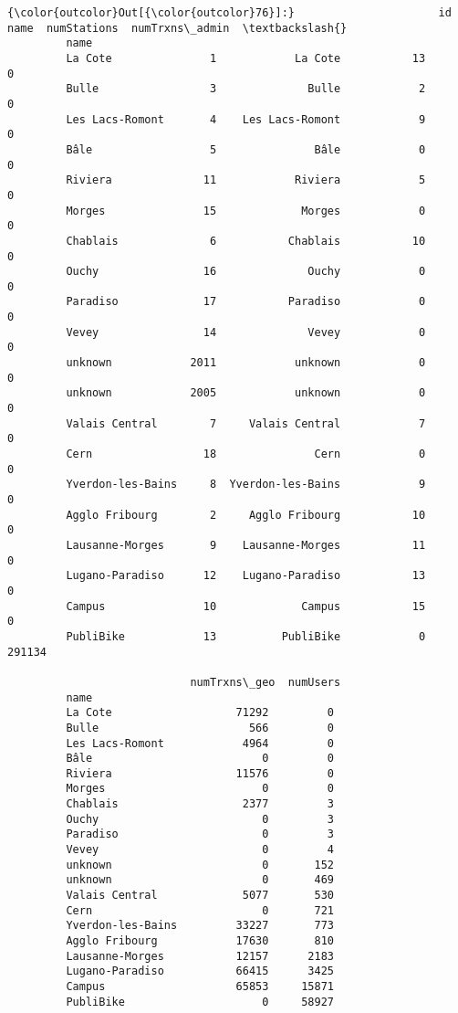 \documentclass{report}
\begin{document}
            \begin{Verbatim}[commandchars=\\\{\}]
{\color{outcolor}Out[{\color{outcolor}76}]:}                      id               name  numStations  numTrxns\_admin  \textbackslash{}
         name                                                                      
         La Cote               1            La Cote           13               0   
         Bulle                 3              Bulle            2               0   
         Les Lacs-Romont       4    Les Lacs-Romont            9               0   
         Bâle                  5               Bâle            0               0   
         Riviera              11            Riviera            5               0   
         Morges               15             Morges            0               0   
         Chablais              6           Chablais           10               0   
         Ouchy                16              Ouchy            0               0   
         Paradiso             17           Paradiso            0               0   
         Vevey                14              Vevey            0               0   
         unknown            2011            unknown            0               0   
         unknown            2005            unknown            0               0   
         Valais Central        7     Valais Central            7               0   
         Cern                 18               Cern            0               0   
         Yverdon-les-Bains     8  Yverdon-les-Bains            9               0   
         Agglo Fribourg        2     Agglo Fribourg           10               0   
         Lausanne-Morges       9    Lausanne-Morges           11               0   
         Lugano-Paradiso      12    Lugano-Paradiso           13               0   
         Campus               10             Campus           15               0   
         PubliBike            13          PubliBike            0          291134   
         
                            numTrxns\_geo  numUsers  
         name                                       
         La Cote                   71292         0  
         Bulle                       566         0  
         Les Lacs-Romont            4964         0  
         Bâle                          0         0  
         Riviera                   11576         0  
         Morges                        0         0  
         Chablais                   2377         3  
         Ouchy                         0         3  
         Paradiso                      0         3  
         Vevey                         0         4  
         unknown                       0       152  
         unknown                       0       469  
         Valais Central             5077       530  
         Cern                          0       721  
         Yverdon-les-Bains         33227       773  
         Agglo Fribourg            17630       810  
         Lausanne-Morges           12157      2183  
         Lugano-Paradiso           66415      3425  
         Campus                    65853     15871  
         PubliBike                     0     58927  
\end{Verbatim}
        


    
    
    
    
\end{document}
